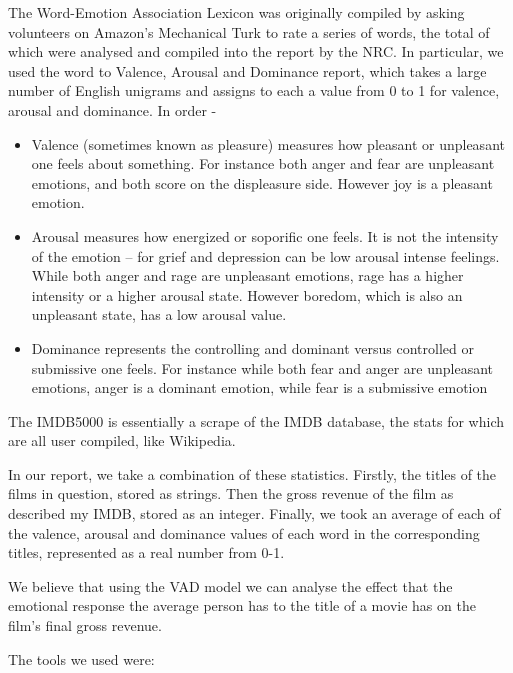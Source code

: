 \documentclass[12pt,a4paper]{article}
\begin{document}
    The Word-Emotion Association Lexicon was originally compiled by asking volunteers on Amazon's Mechanical Turk to rate a series of words, the total of which were analysed and compiled into the report by the NRC. In particular, we used the word to Valence, Arousal and Dominance report, which takes a large number of English unigrams and assigns to each a value from 0 to 1 for valence, arousal and dominance. In order -

    \begin{itemize}
        \item Valence (sometimes known as pleasure) measures how pleasant or unpleasant one feels about something. For instance both anger and fear are unpleasant emotions, and both score on the displeasure side. However joy is a pleasant emotion.
        \item Arousal measures how energized or soporific one feels. It is not the intensity of the emotion -- for grief and depression can be low arousal intense feelings. While both anger and rage are unpleasant emotions, rage has a higher intensity or a higher arousal state. However boredom, which is also an unpleasant state, has a low arousal value.
        \item Dominance represents the controlling and dominant versus controlled or submissive one feels. For instance while both fear and anger are unpleasant emotions, anger is a dominant emotion, while fear is a submissive emotion
    \end{itemize}

    The IMDB5000 is essentially a scrape of the IMDB database, the stats for which are all user compiled, like Wikipedia.

    In our report, we take a combination of these statistics. Firstly, the titles of the films in question, stored as strings. Then the gross revenue of the film as described my IMDB, stored as an integer. Finally, we took an average of each of the valence, arousal and dominance values of each word in the corresponding titles, represented as a real number from 0-1.

    We believe that using the VAD model we can analyse the effect that the emotional response the average person has to the title of a movie has on the film's final gross revenue.

    \newline \newline

    The tools we used were:
\end{document}
